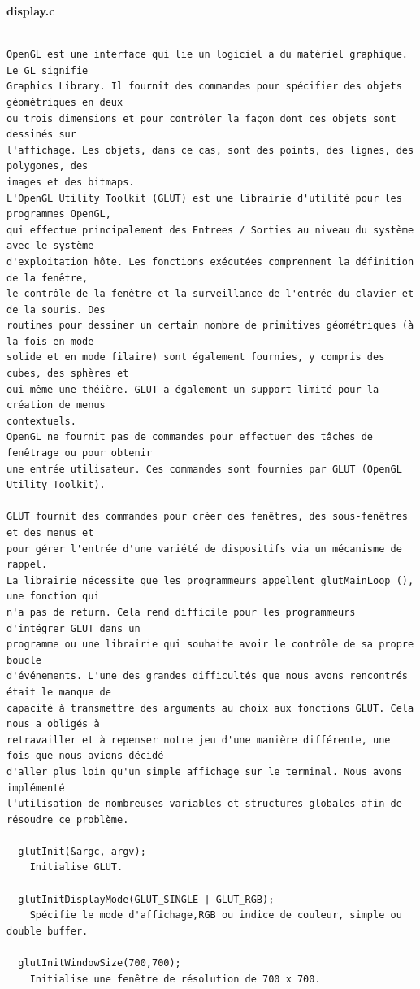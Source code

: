 \documentclass[a4paper]{article}
\begin{document}
\begin{verbatim}
\end{verbatim}

\large\bf{display.c}
\begin{verbatim}

OpenGL est une interface qui lie un logiciel a du matériel graphique. Le GL signifie
Graphics Library. Il fournit des commandes pour spécifier des objets géométriques en deux
ou trois dimensions et pour contrôler la façon dont ces objets sont dessinés sur
l'affichage. Les objets, dans ce cas, sont des points, des lignes, des polygones, des
images et des bitmaps.
L'OpenGL Utility Toolkit (GLUT) est une librairie d'utilité pour les programmes OpenGL,
qui effectue principalement des Entrees / Sorties au niveau du système avec le système
d'exploitation hôte. Les fonctions exécutées comprennent la définition de la fenêtre,
le contrôle de la fenêtre et la surveillance de l'entrée du clavier et de la souris. Des
routines pour dessiner un certain nombre de primitives géométriques (à la fois en mode
solide et en mode filaire) sont également fournies, y compris des cubes, des sphères et
oui même une théière. GLUT a également un support limité pour la création de menus
contextuels.
OpenGL ne fournit pas de commandes pour effectuer des tâches de fenêtrage ou pour obtenir
une entrée utilisateur. Ces commandes sont fournies par GLUT (OpenGL Utility Toolkit).
 
GLUT fournit des commandes pour créer des fenêtres, des sous-fenêtres et des menus et
pour gérer l'entrée d'une variété de dispositifs via un mécanisme de rappel.
La librairie nécessite que les programmeurs appellent glutMainLoop (), une fonction qui
n'a pas de return. Cela rend difficile pour les programmeurs d'intégrer GLUT dans un
programme ou une librairie qui souhaite avoir le contrôle de sa propre boucle
d'événements. L'une des grandes difficultés que nous avons rencontrés était le manque de
capacité à transmettre des arguments au choix aux fonctions GLUT. Cela nous a obligés à
retravailler et à repenser notre jeu d'une manière différente, une fois que nous avions décidé
d'aller plus loin qu'un simple affichage sur le terminal. Nous avons implémenté
l'utilisation de nombreuses variables et structures globales afin de résoudre ce problème.

  glutInit(&argc, argv);
    Initialise GLUT.

  glutInitDisplayMode(GLUT_SINGLE | GLUT_RGB);
    Spécifie le mode d'affichage,RGB ou indice de couleur, simple ou double buffer.
  
  glutInitWindowSize(700,700);
    Initialise une fenêtre de résolution de 700 x 700.


\end{verbatim}
\end{document}
